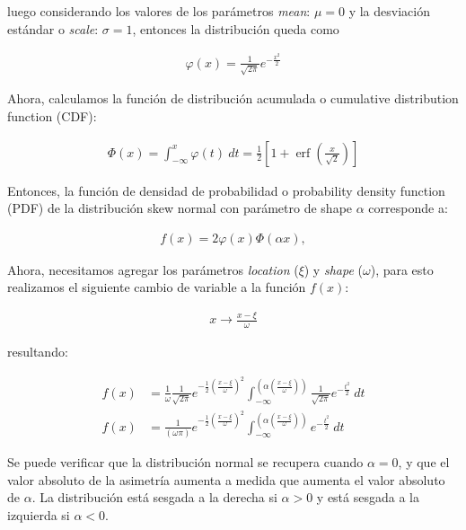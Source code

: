 \documentclass[11pt,letterpaper]{article}
\begin{document}
luego considerando los valores de los parámetros \textit{mean}: $\mu =0 $ y la desviación estándar o \textit{scale}: $\sigma=1$, entonces la distribución queda como 

\begin{align}
{\displaystyle \varphi(x)={\frac {1}{{\sqrt {2\pi }}}}e^{-\frac{x^2}{2}}}
\end{align}

Ahora, calculamos la función de distribución acumulada o cumulative distribution function (CDF):

\begin{align}
\Phi (x)=\int _{{-\infty }}^{{x}}\varphi (t)\ dt={\frac  {1}{2}}\left[1+\operatorname {erf}\left({\frac  {x}{{\sqrt  {2}}}}\right)\right]
\end{align}

Entonces, la función de densidad de probabilidad o probability density function (PDF) de la distribución skew normal con parámetro de shape $\alpha$ corresponde a:

\begin{align}
f(x)=2\varphi (x)\Phi (\alpha x),
\end{align}

Ahora, necesitamos agregar los parámetros \textit{location} ($\xi$) y \textit{shape} ($\omega$), para esto realizamos el siguiente cambio de variable a la función $f(x)$:

\begin{align}
x\rightarrow {\frac  {x-\xi }{\omega }}
\end{align}

resultando:

\begin{align}
f(x) &= \frac{1}{\omega}\frac{1}{\sqrt{2\pi}}e^{-\frac{1}{2}\left( \frac{x-\xi }{\omega }\right)^{2}} \int_{{-\infty }}^{\left(\alpha \left(\frac{x-\xi }{\omega } \right)\right)}\frac{1}{\sqrt{2\pi}}e^{-\frac{t^2}{2}}\ dt \nonumber \\
f(x) &= \frac{1}{(\omega \pi)}e^{-\frac{1}{2}\left( \frac{x-\xi }{\omega }\right)^{2}} \int_{{-\infty }}^{\left(\alpha \left(\frac{x-\xi }{\omega } \right)\right)}e^{-\frac{t^2}{2}}\ dt
\label{skew_normal_dist_mathdef}
\end{align}

Se puede verificar que la distribución normal se recupera cuando ${\displaystyle \alpha =0}$, y que el valor absoluto de la asimetría aumenta a medida que aumenta el valor absoluto de ${\displaystyle \alpha }$. La distribución está sesgada a la derecha si ${\displaystyle \alpha >0}$ y está sesgada a la izquierda si ${\displaystyle \alpha <0}$.
\end{document}
